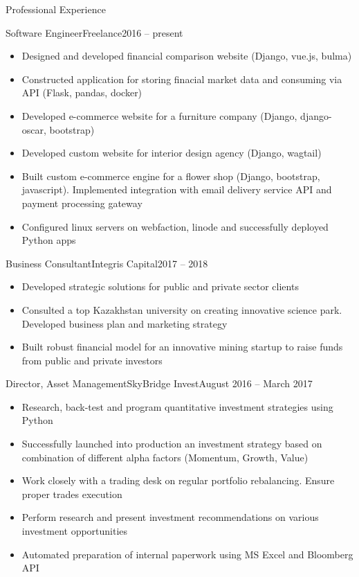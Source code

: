 \documentclass[]{mcdowellcv}
\begin{document}
\makeheader

\begin{cvsection}{Professional Experience}
  \begin{cvsubsection}{Software Engineer}{Freelance}{2016 -- present}
    \begin{itemize}
      \item Designed and developed financial comparison website (Django, vue.js, bulma)
      \item Constructed application for storing finacial market data and consuming via API (Flask, pandas, docker)
      \item Developed e-commerce website for a furniture company (Django, django-oscar, bootstrap)
      \item Developed custom website for interior design agency (Django, wagtail)
      \item Built custom e-commerce engine for a flower shop (Django, bootstrap, javascript). Implemented integration with email delivery service API and payment processing gateway
      \item Configured linux servers on webfaction, linode and successfully deployed Python apps
    \end{itemize}
  \end{cvsubsection}

  \begin{cvsubsection}{Business Consultant}{Integris Capital}{2017 -- 2018}	
    \begin{itemize}
      \item Developed strategic solutions for public and private sector clients
      \item Consulted a top Kazakhstan university on creating innovative science park. Developed business plan and marketing strategy
      \item Built robust financial model for an innovative mining startup to raise funds from public and private investors
    \end{itemize}
  \end{cvsubsection}

  \begin{cvsubsection}{Director, Asset Management}{SkyBridge Invest}{August 2016 -- March 2017}		
    \begin{itemize}
      \item Research, back-test and program quantitative investment strategies using Python
      \item Successfully launched into production an investment strategy based on combination of different alpha factors (Momentum, Growth, Value)
      \item Work closely with a trading desk on regular portfolio rebalancing. Ensure proper trades execution
      \item Perform research and present investment recommendations on various investment opportunities
      \item Automated preparation of internal paperwork using MS Excel and Bloomberg API
    \end{itemize}
  \end{cvsubsection}


\end{cvsection}
\end{document}
